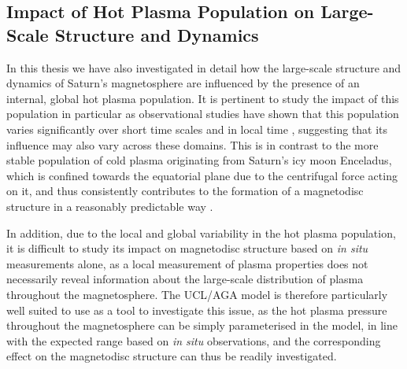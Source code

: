 \subsection{Impact of Hot Plasma Population on Large-Scale Structure and Dynamics}
In this thesis we have also investigated in detail how the large-scale structure and dynamics of Saturn's magnetosphere are influenced by the presence of an internal, global hot plasma population. It is pertinent to study the impact of this population in particular as observational studies have shown that this population varies significantly over short time scales \citep{sergis2011} and in local time \citep{sergis2017}, suggesting that its influence may also vary across these domains. This is in contrast to the more stable population of cold plasma originating from Saturn's icy moon Enceladus, which is confined towards the equatorial plane due to the centrifugal force acting on it, and thus consistently contributes to the formation of a magnetodisc structure in a reasonably predictable way \citep[e.g.][]{arridge2008}. 

In addition, due to the local and global variability in the hot plasma population, it is difficult to study its impact on magnetodisc structure based on \textit{in situ} measurements alone, as a local measurement of plasma properties does not necessarily reveal information about the large-scale distribution of plasma throughout the magnetosphere. The UCL/AGA model is therefore particularly well suited to use as a tool to investigate this issue, as the hot plasma pressure throughout the magnetosphere can be simply parameterised in the model, in line with the expected range based on \textit{in situ} observations, and the corresponding effect on the magnetodisc structure can thus be readily investigated. 

